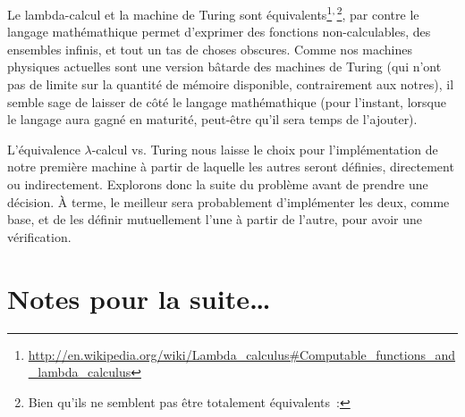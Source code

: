 \documentclass{article}
\begin{document}
Le lambda-calcul et la machine de Turing sont
équivalents\footnote{\url{http://en.wikipedia.org/wiki/Lambda_calculus\#Computable_functions_and_lambda_calculus}}$\vphantom{X}^{,}$\footnote{Bien qu'ils ne
  semblent pas être totalement équivalents\cite{lambda-turing-equivalence}~: },
par contre le langage mathémathique permet d'exprimer des fonctions non-calculables, des ensembles infinis, et tout un tas de choses
obscures. Comme nos machines physiques actuelles sont une version bâtarde des machines de Turing (qui n'ont pas de limite sur la quantité de
mémoire disponible, contrairement aux notres), il semble sage de laisser de côté le langage mathémathique (pour l'instant, lorsque le
langage aura gagné en maturité, peut-être qu'il sera temps de l'ajouter).

L'équivalence $\lambda$-calcul vs. Turing nous laisse le choix pour l'implémentation de notre première machine à partir de laquelle les autres seront définies, directement ou indirectement. Explorons donc la suite du problème avant de prendre une décision. À terme, le meilleur sera probablement d'implémenter les deux, comme base, et de les définir mutuellement l'une à partir de l'autre, pour avoir une vérification.

\section{Notes pour la suite\dots}



\end{document}
